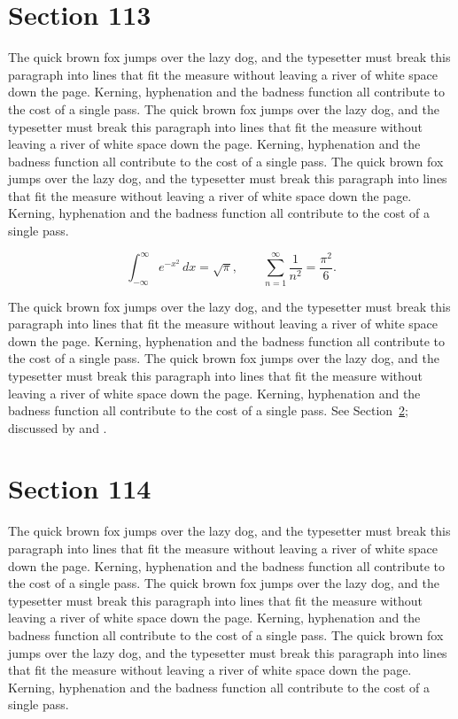 \documentclass{article}
\begin{document}
\section{Section 113}
\label{sec:113}
The quick brown fox jumps over the lazy dog, and the typesetter must break this paragraph into lines that fit the measure without leaving a river of white space down the page. Kerning, hyphenation and the badness function all contribute to the cost of a single pass. The quick brown fox jumps over the lazy dog, and the typesetter must break this paragraph into lines that fit the measure without leaving a river of white space down the page. Kerning, hyphenation and the badness function all contribute to the cost of a single pass. The quick brown fox jumps over the lazy dog, and the typesetter must break this paragraph into lines that fit the measure without leaving a river of white space down the page. Kerning, hyphenation and the badness function all contribute to the cost of a single pass. 

\begin{equation}\label{eq:113}
\int_{-\infty}^{\infty} e^{-x^{2}}\,dx = \sqrt{\pi}, \qquad
\sum_{n=1}^{\infty} \frac{1}{n^{2}} = \frac{\pi^{2}}{6}.
\end{equation}

The quick brown fox jumps over the lazy dog, and the typesetter must break this paragraph into lines that fit the measure without leaving a river of white space down the page. Kerning, hyphenation and the badness function all contribute to the cost of a single pass. The quick brown fox jumps over the lazy dog, and the typesetter must break this paragraph into lines that fit the measure without leaving a river of white space down the page. Kerning, hyphenation and the badness function all contribute to the cost of a single pass. 
See Section~\ref{sec:114}; discussed by \textcite{k4} and \textcite{l1}.
\section{Section 114}
\label{sec:114}
The quick brown fox jumps over the lazy dog, and the typesetter must break this paragraph into lines that fit the measure without leaving a river of white space down the page. Kerning, hyphenation and the badness function all contribute to the cost of a single pass. The quick brown fox jumps over the lazy dog, and the typesetter must break this paragraph into lines that fit the measure without leaving a river of white space down the page. Kerning, hyphenation and the badness function all contribute to the cost of a single pass. The quick brown fox jumps over the lazy dog, and the typesetter must break this paragraph into lines that fit the measure without leaving a river of white space down the page. Kerning, hyphenation and the badness function all contribute to the cost of a single pass. 
\end{document}
